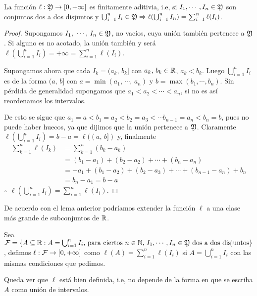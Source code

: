 \begin{lemma}
    La función $\ell : \mathfrak{Y} \to [0, +\infty]$ es finitamente aditivia, i.e, si $I_1, \cdots, I_n \in \mathfrak{Y}$ son conjuntos dos a dos disjuntos y
    $\bigcup_{i = 1}^n I_i \in \mathfrak{Y} \Rightarrow \ell(\bigcup_{i = 1}^n I_n) = \sum_{i = 1}^n \ell(I_i)$.
    \begin{proof}
        Supongamos $I_1\text{, } \cdots \text{, } I_n \in \mathfrak{Y}$, no vacíos, cuya unión también pertenece a $\mathfrak{Y}$.
        Si alguno es no acotado, la unión también y será $\ell(\bigcup_{i = 1}^n I_i) = +\infty = \sum_{i = 1}^n \ell(I_i)$.

        Supongamos ahora que cada $I_k = (a_k\text{, } b_k]$ con $a_k\text{, } b_k \in \mathbb{R}$, $a_k < b_k$.
        Luego $\bigcup_{i = 1}^n I_i$ es de la forma $(a \text{, } b]$ con $a = \min(a_1\text{, } \cdots \text{, } a_n)$ y $b = \max(b_1, \cdots, b_n)$.
        Sin pérdida de generalidad supongamos que $a_1 < a_2 < \cdots < a_n$, si no es así reordenamos los intervalos.

        De esto se sigue que $a_1 = a < b_1 = a_2 < b_2 = a_3 < \cdots b_{n - 1} = a_n < b_n = b$, pues no puede haber huecos, ya que dijimos que la unión pertenece a $\mathfrak{Y}$.
        Claramente $\ell(\bigcup_{i = 1}^n I_i) = b - a = \ell((a\text{, } b])$ y, finalmente \begin{align*}
            \sum_{k = 1}^n \ell(I_k) & = \sum_{k = 1}^n (b_k - a_k) \\
            & = (b_1 - a_1) + (b_2 - a_2) + \cdots + (b_n - a_n) \\
            & = -a_1 + (b_1 - a_2) + (b_2 - a_3) + \cdots + (b_{n - 1} - a_n) + b_n \\
            & = b_n - a_1 = b - a 
        \end{align*}
        $\therefore$ $\ell(\bigcup_{i = 1}^n I_i) = \sum_{i = 1}^n \ell(I_i)$.
    \end{proof}
\end{lemma}

De acuerdo con el lema anterior podríamos extender la función $\ell$ a una clase más grande de subconjuntos de $\mathbb{R}$.

Sea $\mathcal{F} = \{ A \subseteq \mathbb{R} : A = \bigcup_{i = 1}^n I_i \text{, para ciertos } n \in \mathbb{N} \text{, } I_1, \cdots, I_n \in \mathfrak{Y} \text{ dos a dos disjuntos} \}$, 
defimos $\ell : \mathcal{F} \to [0, +\infty]$ como $\ell(A) = \sum_{i = 1}^n \ell(I_i)$ si $A = \bigcup_{i = 1}^n I_i$ con las mismas condiciones que pedimos.

\begin{note}
    Queda ver que $\ell$ está bien definida, i.e, no depende de la forma en que se escriba $A$ como unión de intervalos.
\end{note}

